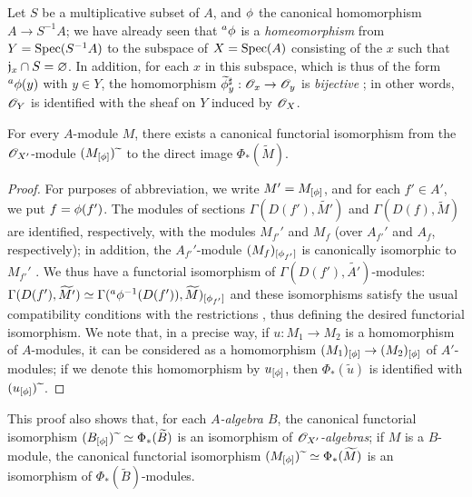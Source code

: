\begin{example}[1.6.2]
\label{I.1.6.2}
Let $S$ be a multiplicative subset of $A$, and $\phi$ the canonical homomorphism $A\to S^{-1}A$;
we have already seen  that ${}^a\phi$ is a \emph{homeomorphism} from $Y=\operatorname{Spec}(S^{-1}A)$ to the subspace of $X=\operatorname{Spec}(A)$ consisting of the $x$ such that $\mathfrak{j}_x\cap S=\varnothing$.
In addition, for each $x$ in this subspace, which is thus of the form ${}^a\phi(y)$ with $y\in Y$, the homomorphism $\widetilde{\vphi}_y^\sharp:\sh{O}_x\to\sh{O}_y$ is
\emph{bijective} ;
in other words, $\mathscr{O}_Y$ is identified with the sheaf on $Y$ induced by $\mathscr{O}_X$.
\end{example}

\begin{proposition}[1.6.3]
\label{I.1.6.3}
For every $A$-module $M$, there exists a canonical functorial isomorphism from the $\mathscr{O}_{X'}$-module $(M_{[\phi]}){\,\widetilde{\,}\,}$ to the direct image $\Phi_*(\widetilde{M})$.
\end{proposition}

\begin{proof}
For purposes of abbreviation, we write $M'=M_{[\phi]}$, and for each $f'\in A'$, we put $f=\phi(f')$.
The modules of sections $\Gamma(D(f'),\widetilde{M'})$ and $\Gamma(D(f),\widetilde{M})$ are identified, respectively, with the modules $M_{f'}'$ and $M_f$ (over $A_{f'}'$ and $A_f$, respectively);
in addition, the $A_{f'}'$-module $(M_f)_{[\phi_{f'}]}$ is canonically isomorphic to $M_{f'}'$ .
We thus have a functorial isomorphism of $\Gamma(D(f'),\widetilde{A'})$-modules: $\Gamma(D(f'),\widetilde{M'}) \simeq\Gamma({}^a\phi^{-1}(D(f')),\widetilde{M})_{[\phi_{f'}]}$ and these isomorphisms satisfy the usual compatibility conditions with the restrictions , thus defining the desired functorial isomorphism.
We note that, in a precise way, if $u:M_1\to M_2$ is a homomorphism of $A$-modules, it can be considered as a homomorphism $(M_1)_{[\vphi]}\to(M_2)_{[\vphi]}$ of $A'$-modules;
if we denote this homomorphism by $u_{[\phi]}$, then $\Phi_*(\widetilde{u})$ is identified with $(u_{[\phi]}){\,\widetilde{\,}\,}$.
\end{proof}

This proof also shows that, for each \emph{$A$-algebra $B$}, the canonical functorial isomorphism
$(B_{[\phi]}){\,\widetilde{\,}\,}\simeq\Phi_*(\widetilde{B})$ is an isomorphism of \emph{$\mathscr{O}_{X'}$-algebras};
if $M$ is a $B$-module, the canonical functorial isomorphism $(M_{[\phi]}){\,\widetilde{\,}\,}\simeq\Phi_*(\widetilde{M})$ is an isomorphism of $\Phi_*(\widetilde{B})$-modules.

